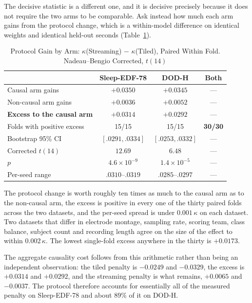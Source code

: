 \documentclass[conference]{IEEEtran}
\begin{document}
The decisive statistic is a different one, and it is decisive precisely because it does not require
the two arms to be comparable. Ask instead how much each arm gains from the protocol change, which
is a within-model difference on identical weights and identical held-out seconds
(Table~\ref{tab:asym}).

\begin{table}[t]
\caption{Protocol Gain by Arm: $\kappa$(Streaming) $-$ $\kappa$(Tiled), Paired Within Fold.
Nadeau--Bengio Corrected, $t(14)$}
\label{tab:asym}
\centering
\footnotesize
\setlength{\tabcolsep}{4pt}
\begin{tabular}{lccc}
\toprule
 & Sleep-EDF-78 & DOD-H & Both \\
\midrule
Causal arm gains       & $+0.0350$ & $+0.0345$ & --- \\
Non-causal arm gains   & $+0.0036$ & $+0.0052$ & --- \\
\midrule
\textbf{Excess to the causal arm} & $\mathbf{+0.0314}$ & $\mathbf{+0.0292}$ & --- \\
Folds with positive excess & 15/15 & 15/15 & \textbf{30/30} \\
Bootstrap 95\% CI & $[.0291,.0334]$ & $[.0253,.0332]$ & --- \\
Corrected $t(14)$ & $12.69$ & $6.48$ & --- \\
$p$ & $4.6\times10^{-9}$ & $1.4\times10^{-5}$ & --- \\
Per-seed range & $.0310$--$.0319$ & $.0285$--$.0297$ & --- \\
\bottomrule
\end{tabular}
\end{table}

The protocol change is worth roughly ten times as much to the causal arm as to the non-causal arm,
the excess is positive in every one of the thirty paired folds across the two datasets, and the
per-seed spread is under $0.001\,\kappa$ on each dataset. Two datasets that differ in electrode
montage, sampling rate, scoring team, class balance, subject count and recording length agree on
the size of the effect to within $0.002\,\kappa$. The lowest single-fold excess anywhere in the
thirty is $+0.0173$.

The aggregate causality cost follows from this arithmetic rather than being an independent
observation: the tiled penalty is $-0.0249$ and $-0.0329$, the excess is $+0.0314$ and $+0.0292$,
and the streaming penalty is what remains, $+0.0065$ and $-0.0037$. The protocol therefore accounts
for essentially all of the measured penalty on Sleep-EDF-78 and about 89\% of it on DOD-H.
\end{document}
